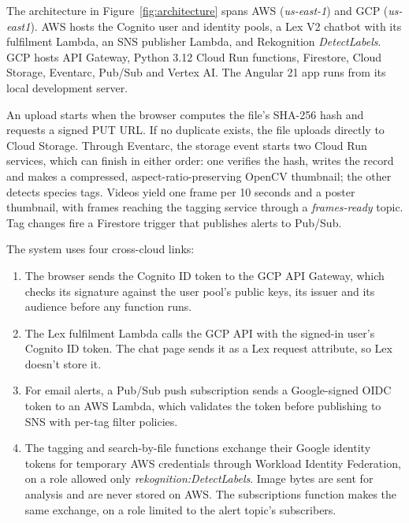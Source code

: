 \documentclass[12pt,a4paper]{article}
\newcommand{\code}[1]{\textit{#1}} %
\begin{document}
The architecture in Figure~\ref{fig:architecture} spans AWS (\code{us-east-1}) and GCP (\code{us-east1}). AWS hosts the Cognito user and identity pools, a Lex V2 chatbot with its fulfilment Lambda, an SNS publisher Lambda, and Rekognition \code{DetectLabels}. GCP hosts API Gateway, Python 3.12 Cloud Run functions, Firestore, Cloud Storage, Eventarc, Pub/Sub and Vertex AI. The Angular 21 app runs from its local development server.

An upload starts when the browser computes the file's SHA-256 hash and requests a signed PUT URL. If no duplicate exists, the file uploads directly to Cloud Storage. Through Eventarc, the storage event starts two Cloud Run services, which can finish in either order: one verifies the hash, writes the record and makes a compressed, aspect-ratio-preserving OpenCV thumbnail; the other detects species tags. Videos yield one frame per 10 seconds and a poster thumbnail, with frames reaching the tagging service through a \code{frames-ready} topic. Tag changes fire a Firestore trigger that publishes alerts to Pub/Sub.

The system uses four cross-cloud links:
\begin{enumerate}
  \item The browser sends the Cognito ID token to the GCP API Gateway, which checks its signature against the user pool's public keys, its issuer and its audience before any function runs.
  \item The Lex fulfilment Lambda calls the GCP API with the signed-in user's Cognito ID token. The chat page sends it as a Lex request attribute, so Lex doesn't store it.
  \item For email alerts, a Pub/Sub push subscription sends a Google-signed OIDC token to an AWS Lambda, which validates the token before publishing to SNS with per-tag filter policies.
  \item The tagging and search-by-file functions exchange their Google identity tokens for temporary AWS credentials through Workload Identity Federation, on a role allowed only \code{rekognition:DetectLabels}. Image bytes are sent for analysis and are never stored on AWS. The subscriptions function makes the same exchange, on a role limited to the alert topic's subscribers.
\end{enumerate}

\clearpage
{}
\begin{landscape}
  \thispagestyle{empty}
  \vspace*{\fill}
  \centering
  
  \label{fig:architecture}
  \vspace*{\fill}
\end{landscape}
\restoregeometry
\end{document}

